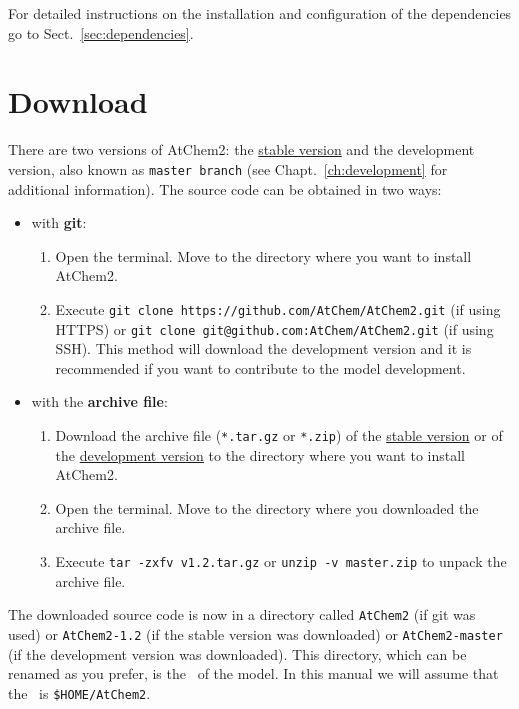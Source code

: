 For detailed instructions on the installation and configuration of the
dependencies go to Sect.~\ref{sec:dependencies}.

\section{Download} \label{sec:download}

There are two versions of AtChem2: the
\href{https://github.com/AtChem/AtChem2/releases}{stable version} and
the development version, also known as \texttt{master\ branch} (see
Chapt.~\ref{ch:development} for additional information). The source
code can be obtained in two ways:

\begin{itemize}
\item with \textbf{git}:
  \begin{enumerate}
  \item Open the terminal. Move to the directory where you want to
    install AtChem2.
  \item Execute \verb|git clone https://github.com/AtChem/AtChem2.git|
    (if using HTTPS) or \verb|git clone git@github.com:AtChem/AtChem2.git|
    (if using SSH).  This method will download the development version
    and it is recommended if you want to contribute to the model
    development.
  \end{enumerate}
\item with the \textbf{archive file}:
  \begin{enumerate}
  \item Download the archive file (\texttt{*.tar.gz} or \texttt{*.zip}) of the
    \href{https://github.com/AtChem/AtChem2/releases}{stable version} or of the
    \href{https://github.com/AtChem/AtChem2/archive/master.zip}{development version}
    to the directory where you want to install AtChem2.
  \item Open the terminal. Move to the directory where you downloaded
    the archive file.
  \item Execute \verb|tar -zxfv v1.2.tar.gz| or
    \verb|unzip -v master.zip| to unpack the archive file.
  \end{enumerate}
\end{itemize}

The downloaded source code is now in a directory called
\texttt{AtChem2} (if git was used) or \texttt{AtChem2-1.2} (if the
stable version was downloaded) or \texttt{AtChem2-master} (if the
development version was downloaded). This directory, which can be
renamed as you prefer, is the \maindir\ of the model. In this manual
we will assume that the \maindir\ is \texttt{\$HOME/AtChem2}.

